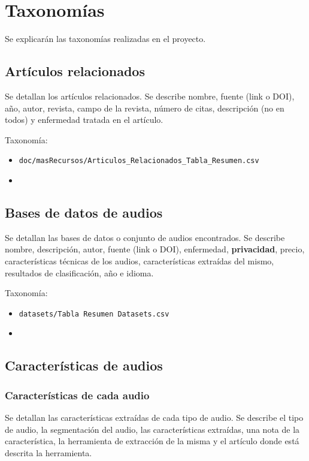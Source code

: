 \section{Taxonomías}
Se explicarán las taxonomías realizadas en el proyecto.

\subsection{Artículos relacionados}
Se detallan los artículos relacionados. Se describe nombre, fuente (link o DOI), año, autor, revista, campo de la revista, número de citas, descripción (no en todos) y enfermedad tratada en el artículo.

Taxonomía:
\begin{itemize}
\item \texttt{doc/masRecursos/Articulos\_Relacionados\_Tabla\_Resumen.csv}
\item {}
\end{itemize}

\subsection{Bases de datos de audios}
Se detallan las bases de datos o conjunto de audios encontrados. Se describe nombre, descripción, autor, fuente (link o DOI), enfermedad, \textbf{privacidad}, precio, características técnicas de los audios, características extraídas del mismo, resultados de clasificación, año e idioma.

Taxonomía:
\begin{itemize}
\item \texttt{datasets/Tabla Resumen Datasets.csv}
\item {}
\end{itemize}

\subsection{Características de audios}
\subsubsection{Características de cada audio}
Se detallan las características extraídas de cada tipo de audio. Se describe el tipo de audio, la segmentación del audio, las características extraídas, una nota de la característica, la herramienta de extracción de la misma y el artículo donde está descrita la herramienta.

